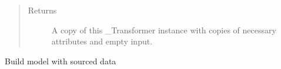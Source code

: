 \documentclass[letterpaper,10pt,english]{sphinxmanual}
\begin{document}
\begin{fulllineitems}
\begin{fulllineitems}
\begin{quote}
\begin{description}
\begin{itemize}
\end{itemize}

\item[{Returns}] \leavevmode
A copy of this \_Transformer instance with copies of necessary
attributes and empty input.

\end{description}\end{quote}

\end{fulllineitems}


\begin{fulllineitems}
\label{\detokenize{dalio.pipe:dalio.pipe.builders.MakeARCH.transform}}
Build model with sourced data

\end{fulllineitems}


\end{fulllineitems}

\end{document}
